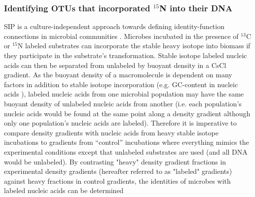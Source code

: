 \subsubsection{Identifying OTUs that incorporated $^{15}$N into their DNA}
SIP is a culture-independent approach towards defining identity-function
connections in microbial communities \citep{Buckley_2011, 17446886}. Microbes
incubated in the presence of $^{13}$C or $^{15}$N labeled substrates can
incorporate the stable heavy isotope into biomass if they participate in the
substrate's transformation.  Stable isotope labeled nucleic acids can then be
separated from unlabeled by buoyant density in a CsCl gradient. As the
buoyant density of a macromolecule is dependent on many factors in addition
to stable isotope incorporation (e.g.  GC-content in nucleic acids
\citep{25139123}), labeled nucleic acids from one microbial population may
have the same buoyant density of unlabeled nucleic acids from another (i.e.
each population's nucleic acids would be found at the same point along a
density gradient although only one population's nucleic acids are labeled).
Therefore it is imperative to compare density gradients with nucleic acids
from heavy stable isotope incubations to gradients from ``control''
incubations where everything mimics the experimental conditions except that
unlabeled substrates are used (and all DNA would be unlabeled).  By
contrasting "heavy" density gradient fractions in experimental density
gradients (hereafter referred to as "labeled" gradients) against heavy
fractions in control gradients, the identities of microbes with labeled
nucleic acids can be determined 

